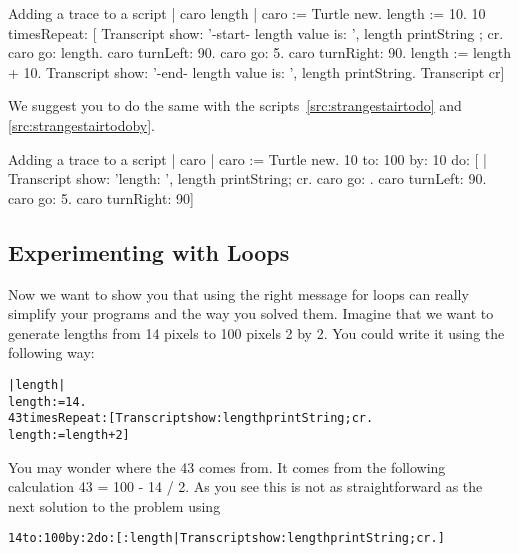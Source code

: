 \begin{scriptwithtitle}{Adding a trace to a script}\label{src:trace}
| caro length |
caro := Turtle new.
length := 10.
10 timesRepeat: [ Transcript show: '-start- length value is: ', 
                                                 length printString ; cr.
                caro go: length.
                caro turnLeft: 90.
                caro go: 5.
                caro turnRight: 90.
                length := length + 10.
                Transcript show: '-end- length value is: ', 
                                             length printString.
                Transcript cr]
\end{scriptwithtitle}

We suggest you to do the same with the scripts~\ref{src:strangestairtodo} and \ref{src:strangestairtodoby}.

\begin{scriptwithtitle}{Adding a trace to a script}\label{src:trace2}
| caro |
caro := Turtle new.
10 to: 100 by: 10  do: 
              [ | 
                 Transcript show: 'length: ', length printString; cr.
                 caro go: .
                 caro turnLeft: 90.
                 caro go: 5.
                 caro turnRight: 90]
\end{scriptwithtitle}




\subsection{Experimenting with Loops}\label{sec:transloops}
Now we want to show you that using the right message for loops can really simplify your programs and the way you solved them. Imagine that we want to generate lengths from 14 pixels to 100 pixels 2 by 2. You could write it using \timesRepeat the following way:

\begin{alltt}
| length |
length := 14.
43 timesRepeat: [ Transcript show: length printString ; cr.
                length := length + 2]
\end{alltt}

You may wonder where the 43 comes from. It comes from the following calculation 43 = 100 - 14 / 2. As you see this is not as
straightforward as the next solution to the problem using 

\begin{alltt}
14 to: 100 by: 2 do: [:length | Transcript show: length printString ; cr.]
\end{alltt}


